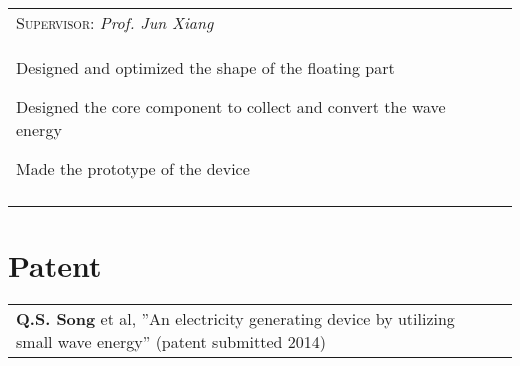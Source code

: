 \documentclass[a4paper,10pt]{article}
\begin{document}
\begin{tabular}{p{14cm}r}
\hspace{1em}  \textsc{Supervisor:} \emph{Prof. Jun Xiang}  & \vspace{-0.5em}\\
\begin{compactitem}
       \item Designed and optimized the shape of the floating part
       \item Designed the core component to collect and convert the wave energy
       \item Made the prototype of the device
     \end{compactitem}&\vspace{-1em} \\
\multicolumn{2}{c}{} \vspace{-1.5em} \\


\end{tabular}

\section{Patent}
\begin{tabular}{ll}
\textbf{Q.S. Song} et al, ”An electricity generating device by utilizing small wave energy” (patent submitted 2014) &\\
\end{tabular}
\end{document}
